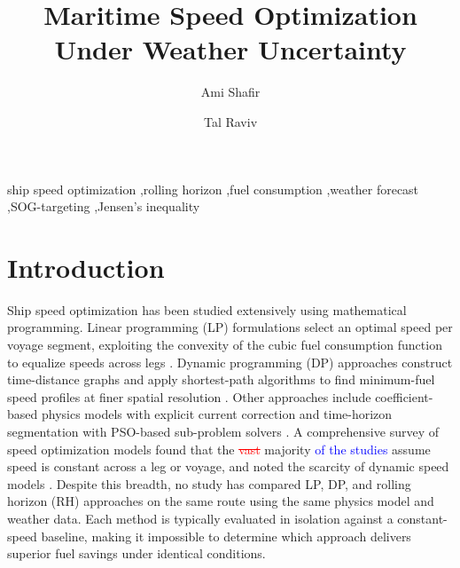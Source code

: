 \documentclass[review,authoryear]{elsarticle}  %
\newcommand{\revadd}[1]{\textcolor{blue}{#1}}
\newcommand{\revdel}[1]{\textcolor{red}{\sout{#1}}}
\begin{document}
\begin{frontmatter}

\title{Maritime Speed Optimization Under Weather Uncertainty}

\author[tau]{Ami Shafir}
\author[tau]{Tal Raviv}
\address[tau]{Faculty of Engineering, Tel Aviv University, Tel Aviv, Israel}

\begin{abstract}

\end{abstract}

\begin{keyword}
ship speed optimization \sep rolling horizon \sep fuel consumption \sep weather forecast \sep SOG-targeting \sep Jensen's inequality
\end{keyword}

\end{frontmatter}

\section{Introduction}
\label{sec:introduction}


Ship speed optimization has been studied extensively using mathematical programming. Linear programming (LP) formulations select an optimal speed per voyage segment, exploiting the convexity of the cubic fuel consumption function to equalize speeds across legs \citep{Fagerholt2010,Norstad2011}. Dynamic programming (DP) approaches construct time-distance graphs and apply shortest-path algorithms to find minimum-fuel speed profiles at finer spatial resolution \citep{Zaccone2018}. Other approaches include coefficient-based physics models with explicit current correction \citep{Yang2020} and time-horizon segmentation with PSO-based sub-problem solvers \citep{Tzortzis2021}. A comprehensive survey of speed optimization models found that the \revdel{vast} majority \revadd{of the studies} assume speed is constant across a leg or voyage, and noted the scarcity of dynamic speed models \citep{Psaraftis2013}. Despite this breadth, no study has compared LP, DP, and rolling horizon (RH)  approaches on the same route using the same physics model and weather data. Each method is typically evaluated in isolation against a constant-speed baseline, making it impossible to determine which approach delivers superior fuel savings under identical conditions.
\end{document}
